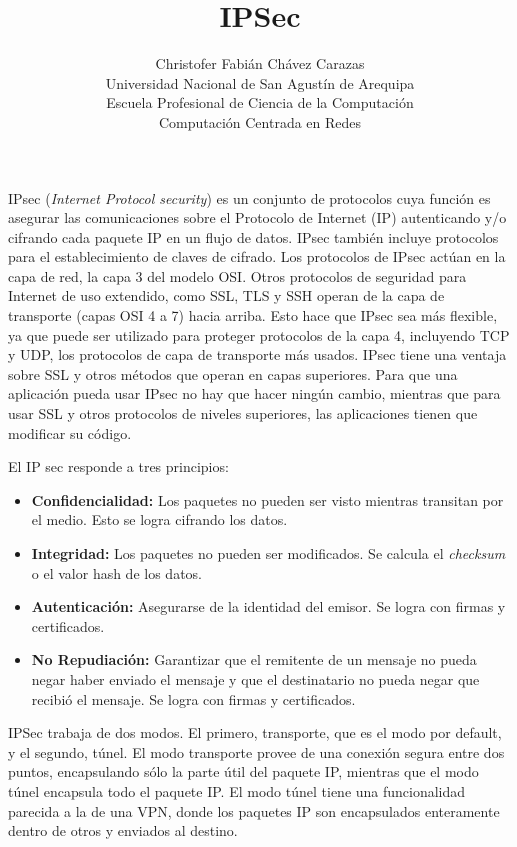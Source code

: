 \documentclass[a4paper,12pt]{article}
\begin{document}
\title{IPSec}
\author{
Christofer Fabián Chávez Carazas \\
\small{Universidad Nacional de San Agustín de Arequipa} \\
\small{Escuela Profesional de Ciencia de la Computación} \\
\small{Computación Centrada en Redes}
}
\date{}

\maketitle

IPsec (\textit{Internet Protocol security}) es un conjunto de protocolos cuya función es asegurar las comunicaciones sobre el Protocolo de Internet (IP) autenticando y/o cifrando cada paquete IP en un flujo de datos.
IPsec también incluye protocolos para el establecimiento de claves de cifrado. Los protocolos de IPsec actúan en la capa de red,
la capa 3 del modelo OSI. Otros protocolos de seguridad para Internet de uso extendido, como SSL, TLS y SSH operan de la capa de transporte (capas OSI 4 a 7) hacia arriba. Esto hace que IPsec sea más flexible, ya que puede ser utilizado para proteger protocolos de la capa 4, incluyendo TCP y UDP, los protocolos de capa de transporte más usados.
IPsec tiene una ventaja sobre SSL y otros métodos que operan en capas superiores. Para que una aplicación pueda usar IPsec no hay que hacer ningún cambio, mientras que para usar SSL y otros protocolos de niveles superiores, las aplicaciones tienen que modificar su código.

El IP sec responde a tres principios:
\begin{itemize}
 \item \textbf{Confidencialidad: } Los paquetes no pueden ser visto mientras transitan por el medio. Esto se logra cifrando los datos.
 \item \textbf{Integridad: } Los paquetes no pueden ser modificados. Se calcula el \textit{checksum} o el valor hash de los datos.
 \item \textbf{Autenticación: } Asegurarse de la identidad del emisor. Se logra con firmas y certificados.
 \item \textbf{No Repudiación: } Garantizar que el remitente de un mensaje no pueda negar haber enviado el mensaje y que el destinatario no pueda negar que recibió el mensaje. Se logra con firmas y certificados.
\end{itemize}

IPSec trabaja de dos modos. El primero, transporte, que es el modo por default, y el segundo, túnel. El modo transporte provee de una conexión segura entre dos puntos, encapsulando sólo la parte útil del paquete IP, mientras
que el modo túnel encapsula todo el paquete IP. El modo túnel tiene una funcionalidad parecida a la de una VPN, donde los paquetes IP son encapsulados enteramente dentro de otros y enviados al destino.
\end{document}
